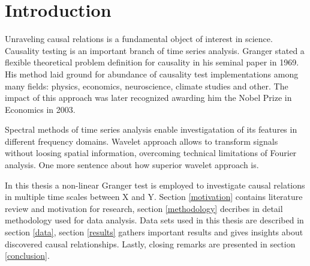 \section{Introduction}

Unraveling causal relations is a fundamental object of interest in science.
Causality testing is an important branch of time series analysis.
Granger \cite{granger69} stated a flexible theoretical problem definition for causality in his seminal paper in 1969.
His method laid ground for abundance of causality test implementations among many fields:
physics, economics, neuroscience, climate studies and other. 
The impact of this approach was later recognized awarding him the Nobel Prize in Economics in 2003. %

Spectral methods of time series analysis enable investigatation of its features in different frequency domains.
Wavelet approach allows to transform signals without loosing spatial information, overcoming technical limitations of Fourier analysis.
One more sentence about how superior wavelet approach is.

In this thesis a non-linear Granger test is employed to investigate causal relations in multiple time scales between X and Y.
Section \ref{motivation} contains literature review and motivation for research,
section \ref{methodology} decribes in detail methodology used for data analysis.
Data sets used in this thesis are described in section \ref{data},
section \ref{results} gathers important results and gives insights about discovered causal relationships.
Lastly, closing remarks are presented in section \ref{conclusion}.
